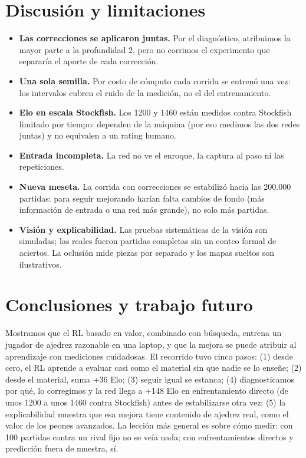 \documentclass[11pt,a4paper]{article}
\begin{document}
\section{Discusión y limitaciones}

\begin{itemize}
\item \textbf{Las correcciones se aplicaron juntas.} Por el diagnóstico,
  atribuimos la mayor parte a la profundidad 2, pero no corrimos el
  experimento que separaría el aporte de cada corrección.
\item \textbf{Una sola semilla.} Por costo de cómputo cada corrida se
  entrenó una vez: los intervalos cubren el ruido de la medición, no el del
  entrenamiento.
\item \textbf{Elo en escala Stockfish.} Los 1200 y 1460 están medidos contra
  Stockfish limitado por tiempo: dependen de la máquina (por eso medimos
  las dos redes juntas) y no equivalen a un rating humano.
\item \textbf{Entrada incompleta.} La red no ve el enroque, la captura al
  paso ni las repeticiones.
\item \textbf{Nueva meseta.} La corrida con correcciones se estabilizó hacia
  las 200.000 partidas: para seguir mejorando harían falta cambios de fondo
  (más información de entrada o una red más grande), no solo más partidas.
\item \textbf{Visión y explicabilidad.} Las pruebas sistemáticas de la
  visión son simuladas; las reales fueron partidas completas sin un conteo
  formal de aciertos. La oclusión mide piezas por separado y los mapas
  sueltos son ilustrativos.
\end{itemize}

\section{Conclusiones y trabajo futuro}

Mostramos que el RL basado en valor, combinado con búsqueda, entrena un
jugador de ajedrez razonable en una laptop, y que la mejora se puede
atribuir al aprendizaje con mediciones cuidadosas. El recorrido tuvo cinco
pasos: (1) desde cero, el RL aprende a evaluar casi como el material sin
que nadie se lo enseñe; (2) desde el material, suma +36 Elo; (3) seguir
igual se estanca; (4) diagnosticamos por qué, lo corregimos y la red llega
a +148 Elo en enfrentamiento directo (de unos 1200 a unos 1460 contra
Stockfish) antes de estabilizarse otra vez; (5) la explicabilidad muestra
que esa mejora tiene contenido de ajedrez real, como el valor de los peones
avanzados. La lección más general es sobre cómo medir: con 100 partidas
contra un rival fijo no se veía nada; con enfrentamientos directos y
predicción fuera de muestra, sí.
\end{document}
